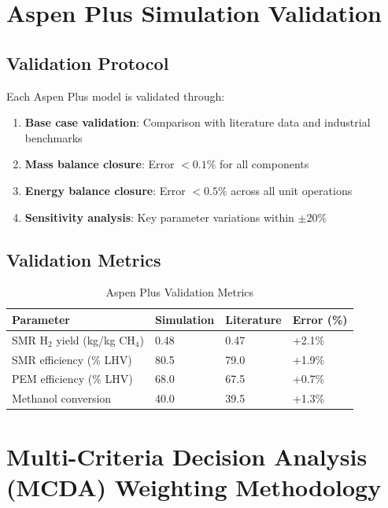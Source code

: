 \documentclass[12pt,twoside,openany]{book}
\newcommand{\tighttabular}{\small\setlength{\tabcolsep}{3.5pt}}
\begin{document}
\section{Aspen Plus Simulation Validation}

\subsection{Validation Protocol}

Each Aspen Plus model is validated through:
\begin{enumerate}
    \item \textbf{Base case validation}: Comparison with literature data and industrial benchmarks
    \item \textbf{Mass balance closure}: Error $<0.1\%$ for all components
    \item \textbf{Energy balance closure}: Error $<0.5\%$ across all unit operations
    \item \textbf{Sensitivity analysis}: Key parameter variations within $\pm 20\%$
\end{enumerate}

\subsection{Validation Metrics}

\begin{table}[htbp]
    \centering
    \tighttabular
    \caption{Aspen Plus Validation Metrics}
    \label{tab:validation}
    \begin{tabular}{L{4cm} C{2.25cm} C{2.25cm} C{2cm}}
    \hline
    \textbf{Parameter} & \textbf{Simulation} & \textbf{Literature} & \textbf{Error (\%)} \\
    \hline
    SMR H$_2$ yield (kg/kg CH$_4$) & 0.48 & 0.47 & +2.1\% \\
    SMR efficiency (\% LHV) & 80.5 & 79.0 & +1.9\% \\
    PEM efficiency (\% LHV) & 68.0 & 67.5 & +0.7\% \\
    Methanol conversion & 40.0 & 39.5 & +1.3\% \\
    \hline
    \end{tabular}
\end{table}

\section{Multi-Criteria Decision Analysis (MCDA) Weighting Methodology}
\end{document}
